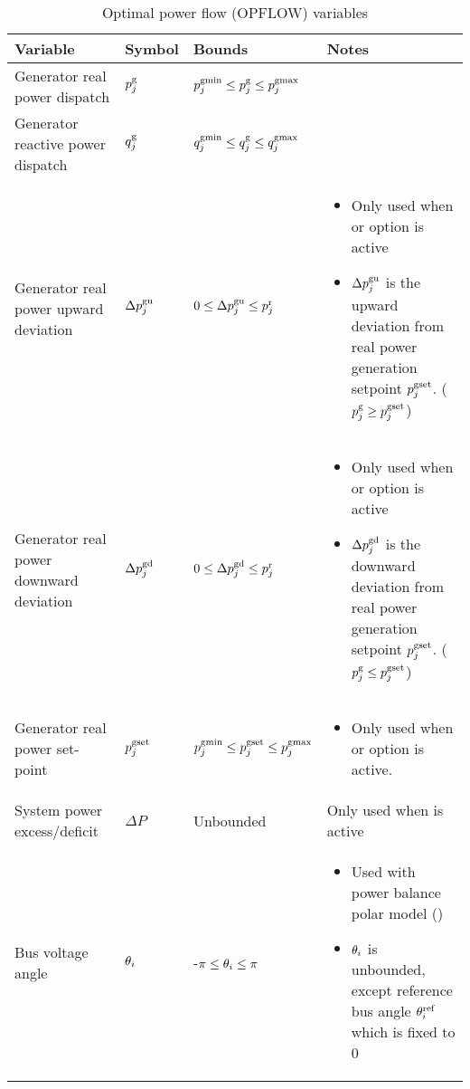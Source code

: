 \begin{table}[!htbp]
\caption{Optimal power flow (OPFLOW) variables}
\small
  \begin{tabular}{|p{}|p{}|p{}|p{}|}
   \hline
    \textbf{Variable} & \textbf{Symbol} & \textbf{Bounds} & \textbf{Notes} \\
    \hline
    Generator real power dispatch & $p^\text{g}_j$ & $p^\text{gmin}_j \le p^\text{g}_j \le p^\text{gmax}_j$ & ~\\
    \hline
    Generator reactive power dispatch & $q^\text{g}_j$ & $q^\text{gmin}_j \le q^\text{g}_j \le q^\text{gmax}_j$ & ~ \\
    \hline
    Generator real power upward deviation & $\Delta{p}^\text{gu}_j$ & $0 \le \Delta{p}^\text{gu}_j \le p^{\text{r}}_j$ & \begin{itemize} \item Only used when \option{\opflowgensetpoint} or \option{\opflowuseagc} option is active \item $\Delta{p}^\text{gu}_j$ is the upward deviation from real power generation setpoint $p^{\text{gset}}_j$. ($p^\text{g}_j \ge p^{\text{gset}}_j$) \end{itemize} \\
    \hline
    Generator real power downward deviation & $\Delta{p}^\text{gd}_j$ & $0 \le \Delta{p}^\text{gd}_j \le p^{\text{r}}_j$ & \begin{itemize} \item Only used when \option{\opflowgensetpoint} or \option{\opflowuseagc} option is active \item $\Delta{p}^\text{gd}_j$ is the downward deviation from real power generation setpoint $p^{\text{gset}}_j$. ($p^\text{g}_j \le p^{\text{gset}}_j$)\end{itemize} \\
    \hline
    Generator real power set-point & $p^{\text{gset}}_j$ & $p^\text{gmin}_j \le p^{\text{gset}}_j \le p^\text{gmax}_j$ & \begin{itemize} \item Only used when \option{\opflowgensetpoint} or \option{\opflowuseagc} option is active. \end{itemize} \\
    \hline
    System power excess/deficit & $\Delta{P}$ & Unbounded & Only used when \option{\opflowuseagc} is active \\
    \hline
    Bus voltage angle & $\theta_i$ & -$\pi \le \theta_i \le \pi$ & 
    \begin{itemize} 
    	\item Used with power balance polar model (\option{\opflowmodel~\pbcar}) 
	\item $\theta_i$ is unbounded, except reference bus angle $\theta^\text{ref}_i$ which is fixed to 0 

\end{itemize}
\end{tabular}
\end{table}
